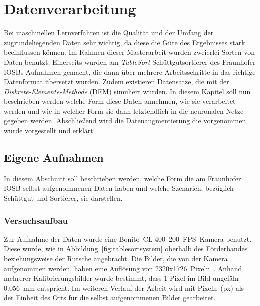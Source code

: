 \chapter{Datenverarbeitung}

Bei maschinellen Lernverfahren ist die Qualität und der Umfang der zugrundeliegenden Daten sehr wichtig,
da diese die Güte des Ergebnisses stark beeinflussen können.
Im Rahmen dieser Masterarbeit wurden zweierlei Sorten von Daten benutzt:
Einerseits wurden am \textit{TableSort} Schüttgutsortierer des Fraunhofer IOSBs Aufnahmen gemacht, 
die dann über mehrere Arbeitsschritte in das richtige Datenformat übersetzt wurden.
Zudem existieren Datensatze, die mit der \textit{Diskrete-Elemente-Methode} (DEM) simuliert wurden. 
In diesem Kapitel soll nun beschrieben werden welche Form diese Daten annehmen, wie sie verarbeitet werden 
und wie in welcher Form sie dann letztendlich in die neuronalen Netze gegeben werden.
Abschließend wird die Datenaugmentierung die vorgenommen wurde vorgestellt und erklärt.





\section{Eigene Aufnahmen}

In diesem Abschnitt soll beschrieben werden, welche Form die am Fraunhofer IOSB selbst aufgenommenen Daten haben und welche Szenarien, bezüglich Schüttgut und Sortierer, sie darstellen.


\subsection{Versuchsaufbau}



Zur Aufnahme der Daten wurde eine Bonito~CL-400~200~FPS~Kamera benutzt. 
Diese wurde, wie in Abbildung~\ref{fig:tablesortsystem} oberhalb des Förderbandes beziehungsweise der Rutsche angebracht.
Die Bilder, die von der Kamera aufgenommen werden, haben eine Auflösung von 2320x1726~Pixeln~\cite{alliedvisiontechnologiesgmbh2014}.
Anhand mehrerer Kalibrierungsbilder wurde bestimmt, dass 1 Pixel im Bild ungefähr \SI{0.056}{\milli\meter} entspricht.
Im weiteren Verlauf der Arbeit wird mit Pixeln~(px) als der Einheit des Orts für die selbst aufgenommenen Bilder gearbeitet.

